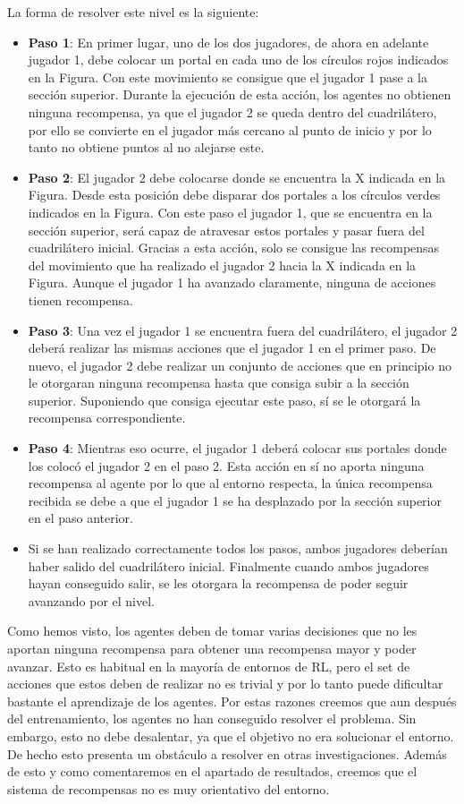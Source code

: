 La forma de resolver este nivel es la siguiente:
\begin{itemize}
    \item \textbf{Paso 1}: En primer lugar, uno de los dos jugadores, de ahora en adelante jugador 1, debe colocar un portal en cada uno de los círculos rojos indicados en la Figura. Con este movimiento se consigue que el jugador 1 pase a la sección superior. Durante la ejecución de esta acción, los agentes no obtienen ninguna recompensa, ya que el jugador 2 se queda dentro del cuadrilátero, por ello se convierte en el jugador más cercano al punto de inicio y por lo tanto no obtiene puntos al no alejarse este.
    \item \textbf{Paso 2}: El jugador 2 debe colocarse donde se encuentra la X indicada en la Figura. Desde esta posición debe disparar dos portales a los círculos verdes indicados en la Figura. Con este paso el jugador 1, que se encuentra en la sección superior, será capaz de atravesar estos portales y pasar fuera del cuadrilátero inicial. Gracias a esta acción, solo se consigue las recompensas del movimiento que ha realizado el jugador 2 hacia la X indicada en la Figura. Aunque el jugador 1 ha avanzado claramente, ninguna de acciones tienen recompensa.
    \item \textbf{Paso 3}: Una vez el jugador 1 se encuentra fuera del cuadrilátero, el jugador 2 deberá realizar las mismas acciones que el jugador 1 en el primer paso. De nuevo, el jugador 2 debe realizar un conjunto de acciones que en principio no le otorgaran ninguna recompensa hasta que consiga subir a la sección superior. Suponiendo que consiga ejecutar este paso, sí se le otorgará la recompensa correspondiente.
    \item \textbf{Paso 4}: Mientras eso ocurre, el jugador 1 deberá colocar sus portales donde los colocó el jugador 2 en el paso 2. Esta acción en sí no aporta ninguna recompensa al agente por lo que al entorno respecta, la única recompensa recibida se debe a que el jugador 1 se ha desplazado por la sección superior en el paso anterior.
    \item Si se han realizado correctamente todos los pasos, ambos jugadores deberían haber salido del cuadrilátero inicial. Finalmente cuando ambos jugadores hayan conseguido salir, se les otorgara la recompensa de poder seguir avanzando por el nivel.
\end{itemize}

Como hemos visto, los agentes deben de tomar varias decisiones que no les aportan ninguna recompensa para obtener una recompensa mayor y poder avanzar. Esto es habitual en la mayoría de entornos de RL, pero el set de acciones que estos deben de realizar no es trivial y por lo tanto puede dificultar bastante el aprendizaje de los agentes. Por estas razones creemos que aun después del entrenamiento, los agentes no han conseguido resolver el problema. Sin embargo, esto no debe desalentar, ya que el objetivo no era solucionar el entorno. De hecho esto presenta un obstáculo a resolver en otras investigaciones. Además de esto y como comentaremos en el apartado de resultados, creemos que el sistema de recompensas no es muy orientativo del entorno.

